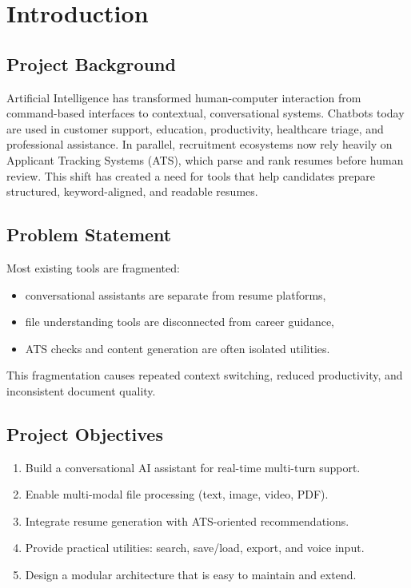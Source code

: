 \documentclass[12pt,a4paper]{report}
\begin{document}
\tableofcontents
\listoffigures
\listoftables
\clearpage

\chapter{Introduction}
\section{Project Background}
Artificial Intelligence has transformed human-computer interaction from command-based interfaces to contextual, conversational systems. Chatbots today are used in customer support, education, productivity, healthcare triage, and professional assistance. In parallel, recruitment ecosystems now rely heavily on Applicant Tracking Systems (ATS), which parse and rank resumes before human review. This shift has created a need for tools that help candidates prepare structured, keyword-aligned, and readable resumes.

\section{Problem Statement}
Most existing tools are fragmented:
\begin{itemize}
  \item conversational assistants are separate from resume platforms,
  \item file understanding tools are disconnected from career guidance,
  \item ATS checks and content generation are often isolated utilities.
\end{itemize}
This fragmentation causes repeated context switching, reduced productivity, and inconsistent document quality.

\section{Project Objectives}
\begin{enumerate}
  \item Build a conversational AI assistant for real-time multi-turn support.
  \item Enable multi-modal file processing (text, image, video, PDF).
  \item Integrate resume generation with ATS-oriented recommendations.
  \item Provide practical utilities: search, save/load, export, and voice input.
  \item Design a modular architecture that is easy to maintain and extend.
\end{enumerate}
\end{document}
